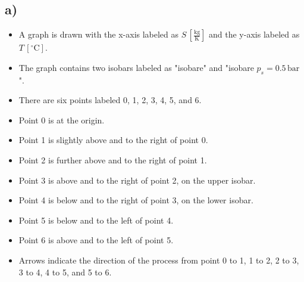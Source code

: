 

\subsection*{a)}

\begin{itemize}
    \item A graph is drawn with the x-axis labeled as $S \, [\frac{\text{kg}}{\text{K}}]$ and the y-axis labeled as $T \, [^\circ \text{C}]$.
    \item The graph contains two isobars labeled as "isobare" and "isobare $p_s = 0.5 \, \text{bar}$".
    \item There are six points labeled 0, 1, 2, 3, 4, 5, and 6.
    \item Point 0 is at the origin.
    \item Point 1 is slightly above and to the right of point 0.
    \item Point 2 is further above and to the right of point 1.
    \item Point 3 is above and to the right of point 2, on the upper isobar.
    \item Point 4 is below and to the right of point 3, on the lower isobar.
    \item Point 5 is below and to the left of point 4.
    \item Point 6 is above and to the left of point 5.
    \item Arrows indicate the direction of the process from point 0 to 1, 1 to 2, 2 to 3, 3 to 4, 4 to 5, and 5 to 6.
\end{itemize}
